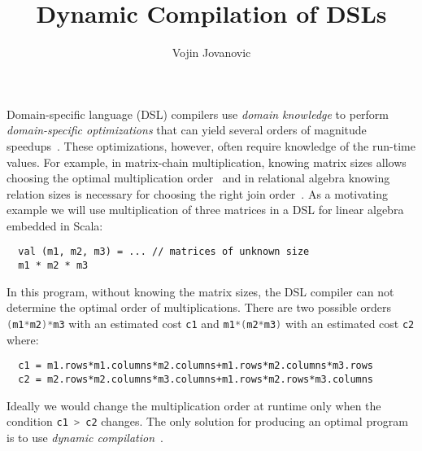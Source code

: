 \documentclass{llncs}
\newcommand{\scode}[1]{\lstinline[language=Scala,columns=fixed,basicstyle=\ttfamily,keywordstyle=\ttfamily]|#1|}
\newcommand{\code}[1]{\scode{#1}}
\begin{document}
\title{Dynamic Compilation of DSLs}

\author{Vojin Jovanovic}

\maketitle

Domain-specific language (DSL) compilers use \emph{domain knowledge} to perform
 \emph{domain-specific optimizations} that can yield several orders of magnitude speedups~\cite{rompf_optimizing_2013}.
 These optimizations, however, often require knowledge of the run-time values. For example,
 in matrix-chain multiplication, knowing matrix sizes allows choosing the
 optimal multiplication order~\cite[Ch.~15.2]{cormen2001introduction} and
 in relational algebra knowing relation sizes is necessary for choosing the right join order~\cite{selinger1979access}.
 As a motivating example we will use multiplication of three matrices in a DSL for linear algebra
 embedded in Scala:
\vspace{0.5em}
\begin{lstlisting}
  val (m1, m2, m3) = ... // matrices of unknown size
  m1 * m2 * m3
\end{lstlisting}
\vspace{0.5em}

In this program, without knowing the matrix sizes, the DSL compiler can not determine the
 optimal order of multiplications. There are two possible orders
 \code{(m1*m2)*m3} with an estimated cost \code{c1} and \code{m1*(m2*m3)} with an estimated cost \code{c2} where:
 \vspace{0.5em}
\begin{lstlisting}
  c1 = m1.rows*m1.columns*m2.columns+m1.rows*m2.columns*m3.rows
  c2 = m2.rows*m2.columns*m3.columns+m1.rows*m2.rows*m3.columns
\end{lstlisting}
\vspace{0.5em}
Ideally we would change the multiplication order at runtime only when the condition \code{c1 > c2} changes.
The only solution for producing an optimal program is to use \emph{dynamic compilation}~\cite{auslander1996fast}.
\end{document}
